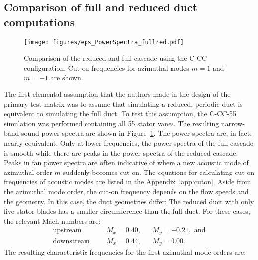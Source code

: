 \subsection{Comparison of full and reduced duct computations}
\begin{figure}
\centering
\texttt{[image: figures/eps\_PowerSpectra\_fullred.pdf]} 
\caption{Comparison of the reduced and full cascade using the C-CC configuration.  Cut-on frequencies for azimuthal modes $m=1$ and $m=-1$ are shown. \label{fig:PowerSpectraFullRed} }
\end{figure}
The first elemental assumption that the authors made in the design of the primary test matrix was to assume that simulating a reduced, periodic duct is equivalent to simulating the full duct.  To test this assumption, the C-CC-55 simulation was performed containing all 55 stator vanes.  The resulting narrow-band sound power spectra are shown in Figure~\ref{fig:PowerSpectraFullRed}.  The power spectra are, in fact, nearly equivalent.  Only at lower frequencies, the power spectra of the full cascade is smooth while there are peaks in the power spectra of the reduced cascade. Peaks in fan power spectra are often indicative of where a new acoustic mode of azimuthal order $m$ suddenly becomes cut-on.  The equations for calculating cut-on frequencies of acoustic modes are listed in the Appendix~\ref{app:cuton}.  Aside from the azimuthal mode order, the cut-on frequency depends on the flow speeds and the geometry.  In this case, the duct geometries differ:  The reduced duct with only five stator blades has a smaller circumference than the full duct. For these cases, the relevant Mach numbers are: 
\begin{align*}
	\text{upstream} &&&M_x = 0.40,	&& M_y =-0.21,\text{ and}\\
	\text{downstream} &&&M_x = 0.44,	&& M_y = 0.00.
\end{align*} 
The resulting characteristic frequencies for the first azimuthal mode orders are:

